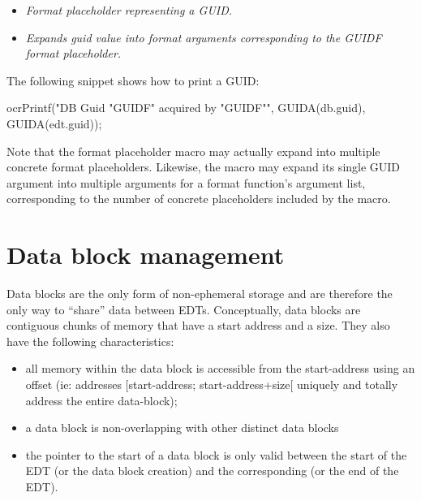 \begin{itemize}
\item {}
  \small \emph{Format placeholder representing a GUID.}
\item {}
  \small \emph{Expands guid value into format arguments
  corresponding to the GUIDF format placeholder.}
\end{itemize}

The following snippet shows how to print a GUID:
\begin{ocrsnip}
ocrPrintf("DB Guid "GUIDF" acquired by "GUIDF"\n", GUIDA(db.guid), GUIDA(edt.guid));
\end{ocrsnip}

Note that the  format placeholder macro may actually expand into
multiple concrete format placeholders. Likewise, the  macro may
expand its single GUID argument into multiple arguments for a format function's
argument list, corresponding to the number of concrete placeholders included
by the  macro.
\section{Data block management}
\label{sec:OCRDataBlockManagement}

Data blocks are the only form of non-\/ephemeral storage and are therefore
the only way to ``share'' data between E\-D\-Ts. Conceptually, data blocks
are contiguous chunks of memory that have a start address and a size.
They also have the following characteristics\-:
\begin{itemize}
\item all memory within the data block is accessible from the start-\/address
  using an offset (ie\-: addresses \mbox{[}start-\/address; start-\/address+size\mbox{[}
  uniquely and totally address the entire data-\/block);
\item a data block is non-\/overlapping with other distinct data blocks
\item the pointer to the start of a data block is only valid between the start
of the E\-D\-T (or the data block creation) and the corresponding 
(or the end of the E\-D\-T).
\end{itemize}

